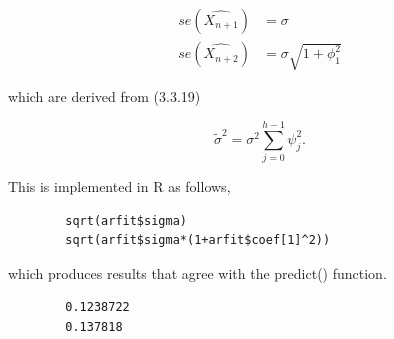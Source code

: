 \documentclass[12pt]{article}
\newenvironment{solution}[2][Solution]{\begin{trivlist}
	\item[\hskip \labelsep {\bfseries #1}]}{\end{trivlist}}
\begin{document}
\begin{solution}{}
\begin{enumerate}[label=(\alph*)]
		\begin{align*}
		se(\hat{X_{n+1}}) &= \sigma \\
		se(\hat{X_{n+2}}) &= \sigma \sqrt{1 + \phi_1^2}
		\end{align*}
		
		which are derived from (3.3.19)
		
		\begin{equation*}
		\widetilde{\sigma}^2 = \sigma^2 \sum_{j=0}^{h-1} \psi^2_j.
		\end{equation*}
		
		This is implemented in R as follows,
		
		\begin{lstlisting}
		sqrt(arfit$sigma)
		sqrt(arfit$sigma*(1+arfit$coef[1]^2))
		\end{lstlisting}
		
		which produces results that agree with the predict() function.
		
		\begin{lstlisting}
 		0.1238722
		0.137818
		\end{lstlisting}
		
	\end{enumerate}
	\end{solution}
	\pagebreak
	
	
\end{document}
